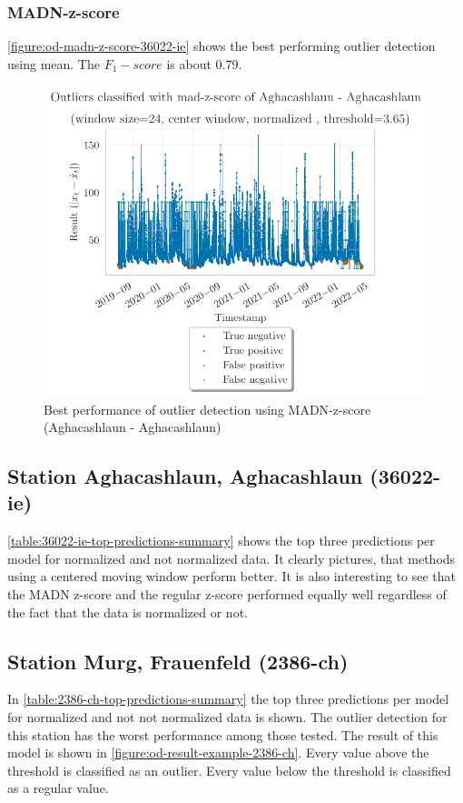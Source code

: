 \subsubsection{MADN-z-score}
\autoref{figure:od-madn-z-score-36022-ie} shows the best performing outlier detection using mean. The $F_1-score$ is about 0.79. %
\begin{figure}[htp]
    \centering 
    \includegraphics{plots/pdfs/36022-ie/od_mad-z-score_36022-ie_all.pdf}
    \caption{Best performance of outlier detection using \ac{MADN}-z-score (Aghacashlaun - Aghacashlaun)}
    \label{figure:od-madn-z-score-36022-ie}
\end{figure}

\subsection{Station Aghacashlaun, Aghacashlaun (36022-ie)}
\autoref{table:36022-ie-top-predictions-summary} shows the top three predictions per model for normalized and not normalized data. It clearly pictures, that methods using a centered moving window perform better. It is also interesting to see that the \ac{MADN} z-score and the regular z-score performed equally well regardless of the fact that the data is normalized or not.


\subsection{Station Murg, Frauenfeld (2386-ch)}
In \autoref{table:2386-ch-top-predictions-summary} the top three predictions per model for normalized and not not normalized data is shown. The outlier detection for this station has the worst performance among those tested. The result of this model is shown in \autoref{figure:od-result-example-2386-ch}. Every value above the threshold is classified as an outlier. Every value below the threshold is classified as a regular value.

